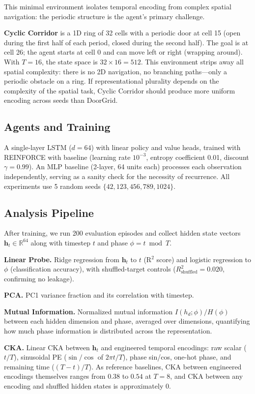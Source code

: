 \documentclass{article}
\begin{document}
This minimal environment isolates temporal encoding from complex spatial navigation: the periodic structure is the agent's primary challenge.

\textbf{Cyclic Corridor} is a 1D ring of 32 cells with a periodic door at cell 15 (open during the first half of each period, closed during the second half).
The goal is at cell 26; the agent starts at cell 0 and can move left or right (wrapping around).
With $T = 16$, the state space is $32 \times 16 = 512$.
This environment strips away all spatial complexity: there is no 2D navigation, no branching paths---only a periodic obstacle on a ring.
If representational plurality depends on the complexity of the spatial task, Cyclic Corridor should produce more uniform encoding across seeds than DoorGrid.

\subsection{Agents and Training}

A single-layer LSTM ($d = 64$) with linear policy and value heads, trained with REINFORCE with baseline (learning rate $10^{-3}$, entropy coefficient 0.01, discount $\gamma = 0.99$).
An MLP baseline (2-layer, 64 units each) processes each observation independently, serving as a sanity check for the necessity of recurrence.
All experiments use 5 random seeds $\{42, 123, 456, 789, 1024\}$.

\subsection{Analysis Pipeline}

After training, we run 200 evaluation episodes and collect hidden state vectors $\mathbf{h}_t \in \mathbb{R}^{64}$ along with timestep $t$ and phase $\phi = t \bmod T$.

\textbf{Linear Probe.}
Ridge regression from $\mathbf{h}_t$ to $t$ (R$^2$ score) and logistic regression to $\phi$ (classification accuracy), with shuffled-target controls ($R^2_{\text{shuffled}} = 0.020$, confirming no leakage).

\textbf{PCA.}
PC1 variance fraction and its correlation with timestep.

\textbf{Mutual Information.}
Normalized mutual information $I(h_d; \phi) / H(\phi)$ between each hidden dimension and phase, averaged over dimensions, quantifying how much phase information is distributed across the representation.

\textbf{CKA.}
Linear CKA \citep{kornblith2019cka} between $\mathbf{h}_t$ and engineered temporal encodings: raw scalar ($t/T$), sinusoidal PE ($\sin/\cos$ of $2\pi t/T$), phase sin/cos, one-hot phase, and remaining time ($(T-t)/T$).
As reference baselines, CKA between engineered encodings themselves ranges from $0.38$ to $0.54$ at $T = 8$, and CKA between any encoding and shuffled hidden states is approximately $0$.
\end{document}
